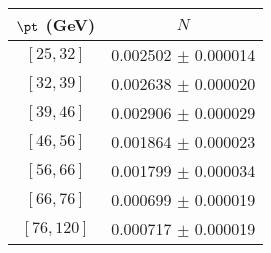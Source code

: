 \begin{tabular}{c||c}
$\pt$ (GeV) & $N$  \\
\hline
$[25, 32]$ & 0.002502 $\pm$ 0.000014\\
$[32, 39]$ & 0.002638 $\pm$ 0.000020\\
$[39, 46]$ & 0.002906 $\pm$ 0.000029\\
$[46, 56]$ & 0.001864 $\pm$ 0.000023\\
$[56, 66]$ & 0.001799 $\pm$ 0.000034\\
$[66, 76]$ & 0.000699 $\pm$ 0.000019\\
$[76, 120]$ & 0.000717 $\pm$ 0.000019\\
\end{tabular}

